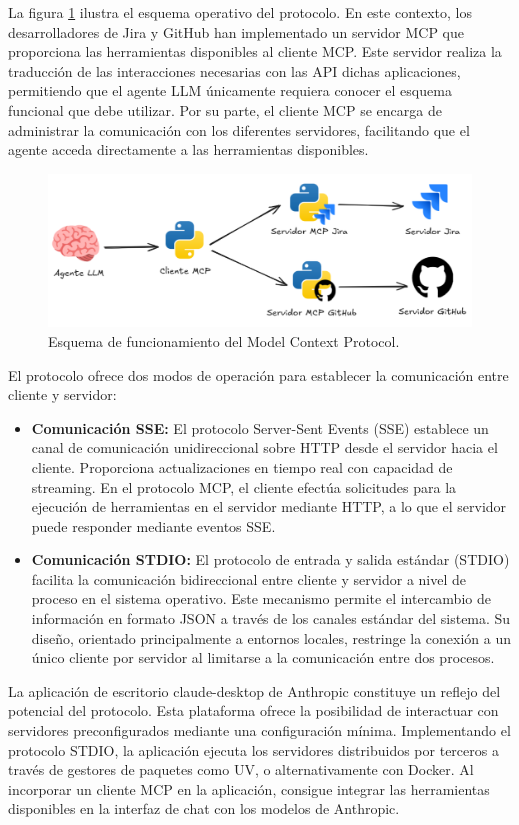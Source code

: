 La figura \ref{fig:mcp} ilustra el esquema operativo del protocolo. En este contexto, los desarrolladores de Jira y GitHub han implementado un servidor MCP que proporciona las herramientas disponibles al cliente MCP. Este servidor realiza la traducción de las interacciones necesarias con las API dichas aplicaciones, permitiendo que el agente LLM únicamente requiera conocer el esquema funcional que debe utilizar. Por su parte, el cliente MCP se encarga de administrar la comunicación con los diferentes servidores, facilitando que el agente acceda directamente a las herramientas disponibles.

\begin{figure}[H]
  \centering
  \includegraphics[width=1\linewidth]{figures/mcp.png}
  \caption{Esquema de funcionamiento del Model Context Protocol.}
  \label{fig:mcp}
\end{figure}


El protocolo ofrece dos modos de operación para establecer la comunicación entre cliente y servidor:
\begin{itemize}
  \item{\textbf{Comunicación SSE: } El protocolo Server-Sent Events (SSE) establece un canal de comunicación unidireccional sobre HTTP desde el servidor hacia el cliente. Proporciona actualizaciones en tiempo real con capacidad de streaming. En el protocolo MCP, el cliente efectúa solicitudes para la ejecución de herramientas en el servidor mediante HTTP, a lo que el servidor puede responder mediante eventos SSE.}
\item{\textbf{Comunicación STDIO: } El protocolo de entrada y salida estándar (STDIO) facilita la comunicación bidireccional entre cliente y servidor a nivel de proceso en el sistema operativo. Este mecanismo permite el intercambio de información en formato JSON a través de los canales estándar del sistema. Su diseño, orientado principalmente a entornos locales, restringe la conexión a un único cliente por servidor al limitarse a la comunicación entre dos procesos.}
\end{itemize}
La aplicación de escritorio claude-desktop de Anthropic constituye un reflejo del potencial del protocolo. Esta plataforma ofrece la posibilidad de interactuar con servidores preconfigurados mediante una configuración mínima. Implementando el protocolo STDIO, la aplicación ejecuta los servidores distribuidos por terceros a través de gestores de paquetes como UV, o alternativamente con Docker. Al incorporar un cliente MCP en la aplicación, consigue integrar las herramientas disponibles en la interfaz de chat con los modelos de Anthropic.


